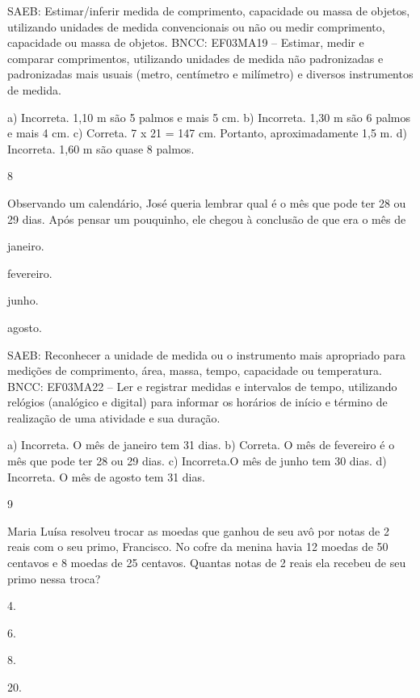 \begin{multicols}{2}
{\begin{escolha}
{SAEB: Estimar/inferir medida de comprimento, capacidade ou massa de objetos, utilizando unidades de medida convencionais ou não ou medir comprimento, capacidade ou massa de objetos.
BNCC: EF03MA19 -- Estimar, medir e comparar comprimentos, utilizando unidades de medida
não padronizadas e padronizadas mais usuais (metro, centímetro e milímetro) e diversos
instrumentos de medida.

a) Incorreta. 1,10 m são 5 palmos e mais 5 cm.
b) Incorreta. 1,30 m são 6 palmos e mais 4 cm. 
c) Correta. 7 x 21 = 147 cm. Portanto, aproximadamente 1,5 m.
d) Incorreta. 1,60 m são quase 8 palmos.

\num{8}

Observando um calendário, José queria lembrar qual é o mês que pode ter 28 ou 29 dias. Após pensar um pouquinho, ele chegou à conclusão de que era o mês de

\begin{escolha}
\item
  janeiro.
\item
  fevereiro.
\item
  junho.
\item
  agosto.
\end{escolha}

SAEB: Reconhecer a unidade de medida ou o instrumento mais apropriado para medições de comprimento, área, massa, tempo, capacidade ou temperatura.
BNCC: EF03MA22 -- Ler e registrar medidas e intervalos de tempo, utilizando relógios (analógico e
digital) para informar os horários de início e término de realização de uma atividade e sua
duração.

a) Incorreta. O mês de janeiro tem 31 dias.
b) Correta. O mês de fevereiro é o mês que pode ter 28 ou 29 dias.
c) Incorreta.O mês de junho tem 30 dias.
d) Incorreta. O mês de agosto tem 31 dias.

\num{9}

Maria Luísa resolveu trocar as moedas que ganhou de seu avô por notas de
2 reais com o seu primo, Francisco. No cofre da menina havia 12 moedas de 50
centavos e 8 moedas de 25 centavos. Quantas notas de 2 reais ela recebeu
de seu primo nessa troca?

\begin{escolha}
\item
  4.
\item
  6.
\item
  8.
\item
  20.
\end{escolha}

}
\end{escolha}}
\end{multicols}
